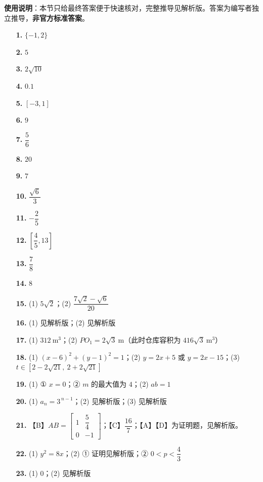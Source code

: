 
\begin{gknotice}
\textbf{使用说明}：本节只给最终答案便于快速核对，完整推导见解析版。答案为编写者独立推导，\textbf{非官方标准答案}。
\end{gknotice}

\begin{itemize}[leftmargin=2.6em]
  \item[\textbf{1.}] \(\{-1,2\}\)
  \item[\textbf{2.}] \(5\)
  \item[\textbf{3.}] \(2\sqrt{10}\)
  \item[\textbf{4.}] \(0.1\)
  \item[\textbf{5.}] \([-3,1]\)
  \item[\textbf{6.}] \(9\)
  \item[\textbf{7.}] \(\dfrac{5}{6}\)
  \item[\textbf{8.}] \(20\)
  \item[\textbf{9.}] \(7\)
  \item[\textbf{10.}] \(\dfrac{\sqrt{6}}{3}\)
  \item[\textbf{11.}] \(-\dfrac{2}{5}\)
  \item[\textbf{12.}] \(\left[\dfrac{4}{5},13\right]\)
  \item[\textbf{13.}] \(\dfrac{7}{8}\)
  \item[\textbf{14.}] \(8\)
\end{itemize}

\begin{itemize}[leftmargin=2.6em]
  \item[\textbf{15.}] (1) \(5\sqrt{2}\)；(2) \(\dfrac{7\sqrt{2}-\sqrt{6}}{20}\)
  \item[\textbf{16.}] (1) 见解析版；(2) 见解析版
  \item[\textbf{17.}] (1) \(312\ \mathrm{m}^{3}\)；(2) \(PO_{1}=2\sqrt{3}\ \mathrm{m}\)（此时仓库容积为 \(416\sqrt{3}\ \mathrm{m}^{3}\)）
  \item[\textbf{18.}] (1) \((x-6)^{2}+(y-1)^{2}=1\)；(2) \(y=2x+5\) 或 \(y=2x-15\)；(3) \(t\in[2-2\sqrt{21},\ 2+2\sqrt{21}]\)
  \item[\textbf{19.}] (1) ① \(x=0\)；② \(m\) 的最大值为 \(4\)；(2) \(ab=1\)
  \item[\textbf{20.}] (1) \(a_{n}=3^{\,n-1}\)；(2) 见解析版；(3) 见解析版
\end{itemize}

\begin{itemize}[leftmargin=2.6em]
  \item[\textbf{21.}] 【B】$AB=\begin{bmatrix}1&\dfrac{5}{4}\\0&-1\end{bmatrix}$；【C】\(\dfrac{16}{7}\)；【A】【D】为证明题，见解析版。
  \item[\textbf{22.}] (1) \(y^{2}=8x\)；(2) ① 证明见解析版；② \(0<p<\dfrac{4}{3}\)
  \item[\textbf{23.}] (1) \(0\)；(2) 见解析版
\end{itemize}

